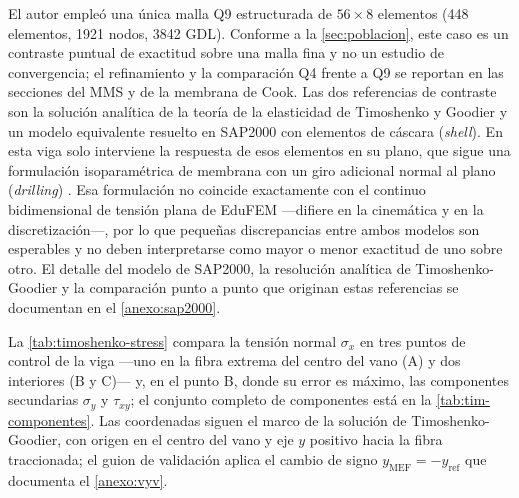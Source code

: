 El autor empleó una única malla Q9 estructurada de $56\times8$ elementos (448 elementos, 1921 nodos, 3842 GDL). Conforme a la \autoref{sec:poblacion}, este caso es un contraste puntual de exactitud sobre una malla fina y no un estudio de convergencia; el refinamiento y la comparación Q4 frente a Q9 se reportan en las secciones del MMS y de la membrana de Cook. Las dos referencias de contraste son la solución analítica de la teoría de la elasticidad de Timoshenko y Goodier \autocite[art.~21, pp.~39-43]{timoshenko1970elasticity} y un modelo equivalente resuelto en SAP2000 con elementos de cáscara (\emph{shell}). En esta viga solo interviene la respuesta de esos elementos en su plano, que sigue una formulación isoparamétrica de membrana con un giro adicional normal al plano (\emph{drilling}) \autocite[p.~179]{csi2017sap2000}. Esa formulación no coincide exactamente con el continuo bidimensional de tensión plana de EduFEM —difiere en la cinemática y en la discretización—, por lo que pequeñas discrepancias entre ambos modelos son esperables y no deben interpretarse como mayor o menor exactitud de uno sobre otro. El detalle del modelo de SAP2000, la resolución analítica de Timoshenko-Goodier y la comparación punto a punto que originan estas referencias se documentan en el \autoref{anexo:sap2000}.

La \autoref{tab:timoshenko-stress} compara la tensión normal $\sigma_x$ en tres puntos de control de la viga —uno en la fibra extrema del centro del vano (A) y dos interiores (B y C)— y, en el punto B, donde su error es máximo, las componentes secundarias $\sigma_y$ y $\tau_{xy}$; el conjunto completo de componentes está en la \autoref{tab:tim-componentes}. Las coordenadas siguen el marco de la solución de Timoshenko-Goodier, con origen en el centro del vano y eje $y$ positivo hacia la fibra traccionada; el guion de validación aplica el cambio de signo $y_{\text{MEF}} = -y_{\text{ref}}$ que documenta el \autoref{anexo:vyv}.

